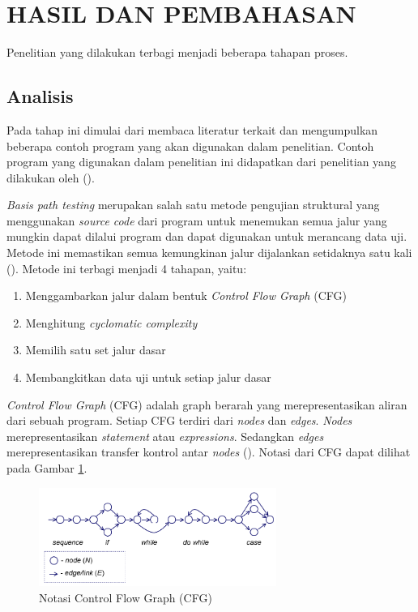 \section*{HASIL DAN PEMBAHASAN}

Penelitian yang dilakukan terbagi menjadi beberapa tahapan proses. 

\subsection*{Analisis}

Pada tahap ini dimulai dari membaca literatur terkait dan mengumpulkan beberapa contoh program yang akan digunakan dalam penelitian. Contoh program yang digunakan dalam penelitian ini didapatkan dari penelitian yang dilakukan oleh \citeauthor{HERMADI2015} (\cite*{HERMADI2015}).  

\textit{Basis path testing} merupakan salah satu metode pengujian struktural yang menggunakan \textit{source code} dari program untuk menemukan semua jalur yang mungkin dapat dilalui program dan dapat digunakan untuk merancang data uji. Metode ini memastikan semua kemungkinan jalur dijalankan setidaknya satu kali (\cite{BASU2015}). Metode ini terbagi menjadi 4 tahapan, yaitu:
\begin{enumerate}[noitemsep] 
	\item Menggambarkan jalur dalam bentuk \textit{ Control Flow Graph} (CFG)
	\item Menghitung \textit{cyclomatic complexity}
	\item Memilih satu set jalur dasar
	\item Membangkitkan data uji untuk setiap jalur dasar
\end{enumerate}

\textit{Control Flow Graph }(CFG) adalah graph berarah yang merepresentasikan aliran dari sebuah program. Setiap CFG terdiri dari \textit{nodes} dan \textit{edges}. \textit{Nodes} merepresentasikan \textit{statement} atau \textit{expressions}. Sedangkan \textit{edges} merepresentasikan transfer kontrol antar \textit{nodes} (\cite{MCCABE}). Notasi dari CFG dapat dilihat pada Gambar \ref{fig:cfg}.
\begin{figure}[h]
	\centering
	\includegraphics[width=220pt]{gambar/CFG2}
	\caption{Notasi Control Flow Graph (CFG)}
	\label{fig:cfg}
\end{figure}

